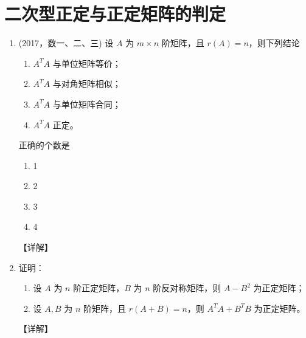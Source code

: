 \documentclass[12pt, a4paper, oneside, UTF8]{ctexbook}
\begin{document}
\section{二次型正定与正定矩阵的判定}

\begin{enumerate}[label=\arabic*.,start=6]
    \item (2017，数一、二、三) 设 $ A $ 为 $ m \times n $ 阶矩阵，且 $ r(A) = n $，则下列结论
    \begin{enumerate}
        \item $ A^T A $ 与单位矩阵等价；
        \item $ A^T A $ 与对角矩阵相似；
        \item $ A^T A $ 与单位矩阵合同；
        \item $ A^T A $ 正定。
    \end{enumerate}
    正确的个数是
    \begin{enumerate}
        \item 1
        \item 2
        \item 3
        \item 4
    \end{enumerate}
    
    \begin{solution}
    【详解】
    \end{solution}
    
    \item 证明：
    \begin{enumerate}
        \item 设 $ A $ 为 $ n $ 阶正定矩阵，$ B $ 为 $ n $ 阶反对称矩阵，则 $ A - B^2 $ 为正定矩阵；
        \item 设 $ A, B $ 为 $ n $ 阶矩阵，且 $ r(A + B) = n $，则 $ A^T A + B^T B $ 为正定矩阵。
    \end{enumerate}
    
    \begin{solution}
    【详解】
    \end{solution}
\end{enumerate}

\ifx\allfiles\undefined
\end{document}
